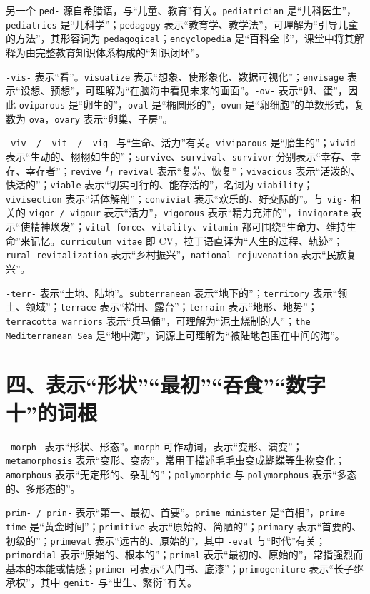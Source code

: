 \documentclass[UTF8,zihao=-4]{ctexart}
\begin{document}
另一个 \texttt{ped-} 源自希腊语，与“儿童、教育”有关。\texttt{pediatrician} 是“儿科医生”，\texttt{pediatrics} 是“儿科学”；\texttt{pedagogy} 表示“教育学、教学法”，可理解为“引导儿童的方法”，其形容词为 \texttt{pedagogical}；\texttt{encyclopedia} 是“百科全书”，课堂中将其解释为由完整教育知识体系构成的“知识闭环”。

\texttt{-vis-} 表示“看”。\texttt{visualize} 表示“想象、使形象化、数据可视化”；\texttt{envisage} 表示“设想、预想”，可理解为“在脑海中看见未来的画面”。\texttt{-ov-} 表示“卵、蛋”，因此 \texttt{oviparous} 是“卵生的”，\texttt{oval} 是“椭圆形的”，\texttt{ovum} 是“卵细胞”的单数形式，复数为 \texttt{ova}，\texttt{ovary} 表示“卵巢、子房”。

\texttt{-viv- / -vit- / -vig-} 与“生命、活力”有关。\texttt{viviparous} 是“胎生的”；\texttt{vivid} 表示“生动的、栩栩如生的”；\texttt{survive}、\texttt{survival}、\texttt{survivor} 分别表示“幸存、幸存、幸存者”；\texttt{revive} 与 \texttt{revival} 表示“复苏、恢复”；\texttt{vivacious} 表示“活泼的、快活的”；\texttt{viable} 表示“切实可行的、能存活的”，名词为 \texttt{viability}；\texttt{vivisection} 表示“活体解剖”；\texttt{convivial} 表示“欢乐的、好交际的”。与 \texttt{vig-} 相关的 \texttt{vigor / vigour} 表示“活力”，\texttt{vigorous} 表示“精力充沛的”，\texttt{invigorate} 表示“使精神焕发”；\texttt{vital force}、\texttt{vitality}、\texttt{vitamin} 都可围绕“生命力、维持生命”来记忆。\texttt{curriculum vitae} 即 CV，拉丁语直译为“人生的过程、轨迹”；\texttt{rural revitalization} 表示“乡村振兴”，\texttt{national rejuvenation} 表示“民族复兴”。

\texttt{-terr-} 表示“土地、陆地”。\texttt{subterranean} 表示“地下的”；\texttt{territory} 表示“领土、领域”；\texttt{terrace} 表示“梯田、露台”；\texttt{terrain} 表示“地形、地势”；\texttt{terracotta warriors} 表示“兵马俑”，可理解为“泥土烧制的人”；\texttt{the Mediterranean Sea} 是“地中海”，词源上可理解为“被陆地包围在中间的海”。

\section*{四、表示“形状”“最初”“吞食”“数字十”的词根}

\texttt{-morph-} 表示“形状、形态”。\texttt{morph} 可作动词，表示“变形、演变”；\texttt{metamorphosis} 表示“变形、变态”，常用于描述毛毛虫变成蝴蝶等生物变化；\texttt{amorphous} 表示“无定形的、杂乱的”；\texttt{polymorphic} 与 \texttt{polymorphous} 表示“多态的、多形态的”。

\texttt{prim- / prin-} 表示“第一、最初、首要”。\texttt{prime minister} 是“首相”，\texttt{prime time} 是“黄金时间”；\texttt{primitive} 表示“原始的、简陋的”；\texttt{primary} 表示“首要的、初级的”；\texttt{primeval} 表示“远古的、原始的”，其中 \texttt{-eval} 与“时代”有关；\texttt{primordial} 表示“原始的、根本的”；\texttt{primal} 表示“最初的、原始的”，常指强烈而基本的本能或情感；\texttt{primer} 可表示“入门书、底漆”；\texttt{primogeniture} 表示“长子继承权”，其中 \texttt{genit-} 与“出生、繁衍”有关。
\end{document}
